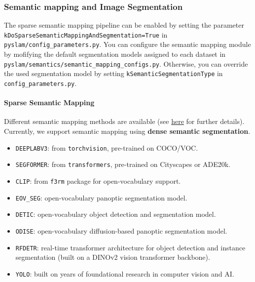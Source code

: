 \documentclass{article}
\let\oldparagraph\paragraph
\renewcommand{\paragraph}[1]{\oldparagraph{#1}\mbox{}}
\begin{document}
\hypertarget{semantic-mapping-and-image-segmentation}{%
\subsubsection{Semantic mapping and Image
Segmentation}\label{semantic-mapping-and-image-segmentation}}

The sparse semantic mapping pipeline can be enabled by setting the
parameter \texttt{kDoSparseSemanticMappingAndSegmentation=True} in
\texttt{pyslam/config\_parameters.py}. You can configure the semantic
mapping module by mofifying the default segmentation models assigned to
each dataset in \texttt{pyslam/semantics/semantic\_mapping\_configs.py}.
Otherwise, you can override the used segmentation model by setting
\texttt{kSemanticSegmentationType} in \texttt{config\_parameters.py}.

\hypertarget{sparse-semantic-mapping}{%
\paragraph{Sparse Semantic Mapping}\label{sparse-semantic-mapping}}

Different semantic mapping methods are available (see
\href{https://github.com/luigifreda/pyslam/blob/master/docs/semantics.md}{here} for further details). Currently, we
support semantic mapping using \textbf{dense semantic segmentation}. 
\begin{itemize}
\item \texttt{DEEPLABV3}: from \texttt{torchvision}, pre-trained on COCO/VOC.
\item \texttt{SEGFORMER}: from \texttt{transformers}, pre-trained on Cityscapes or ADE20k.
\item \texttt{CLIP}: from \texttt{f3rm} package for open-vocabulary support.
\item \texttt{EOV\_SEG}: open-vocabulary panoptic segmentation model.
\item \texttt{DETIC}: open-vocabulary object detection and segmentation model.
\item \texttt{ODISE}: open-vocabulary diffusion-based panoptic segmentation model.
\item \texttt{RFDETR}: real-time transformer architecture for object detection and instance segmentation (built on a DINOv2 vision transformer backbone). 
\item \texttt{YOLO}: built on years of foundational research in computer vision and AI. 
\end{itemize}
\end{document}
